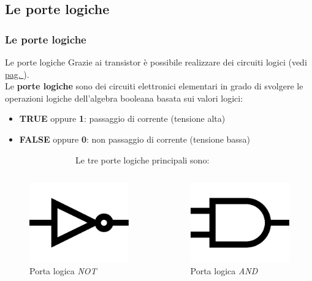 \subsection[Le porte logiche]{Le porte logiche}
\begin{frame}
	\frametitle{Le porte logiche}
	
	\begin{block}{Le porte logiche}
		Grazie ai transistor è possibile realizzare dei circuiti logici (vedi \hyperlink{fig:electronics_transistors}{pag. \pageref{fig:electronics_transistors}}).\\
		Le \textbf{porte logiche} sono dei circuiti elettronici elementari in grado di svolgere le operazioni logiche dell'algebra booleana basata sui valori logici:
		\begin{itemize}
			\item \textbf{TRUE} oppure \textbf{1}: passaggio di corrente (tensione alta)
			\item \textbf{FALSE} oppure \textbf{0}: non passaggio di corrente (tensione bassa)
		\end{itemize}
	\end{block}
	$\qquad\qquad\qquad\qquad\:$Le tre porte logiche principali sono:
	
	\begin{columns}
		\begin{figure}[!htbp]
			\centering 
			\includegraphics[width=0.5\linewidth]{images/2_elettronica/logic_gate_not.pdf}
			\caption{Porta logica \textit{NOT}}
		\end{figure}
		
		\begin{figure}[!htbp]
			\centering 
			\includegraphics[width=0.5\linewidth]{images/2_elettronica/logic_gate_and.pdf}
			\caption{Porta logica \textit{AND}}
		\end{figure} 
		

\end{columns}
\end{frame}
